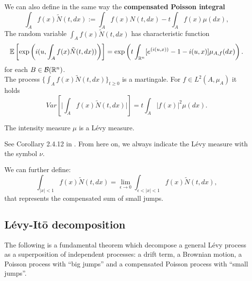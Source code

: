 \noindent
We can also define in the same way the \textbf{compensated Poisson integral}
\begin{equation}
  \int_A f(x) \tilde{N}(t,dx) := \int_A f(x) N(t,dx) - t \int_A f(x) \mu(dx), 
\end{equation}
The random variable $\int_A f(x) \tilde{N}(t,dx)$ has characteristic function
\begin{equation}
  \mathbb{E} \left[ \exp \left( i(u,\int_A f(x) \tilde{N}(t,dx)) \right) \right] = 
  \exp \left( t \int_{\mathbb{R}^n} [e^{(i(u,x))}-1-i(u,x)] \mu_{A,f}(dx) \right).
\end{equation}
for each $B \in \mathcal{B}(\mathbb{R}^n)$. \\
The process $\{\int_A f(x) \tilde N(t,dx)\}_{t \ge 0}$ is a martingale. For $f \in L^2(A,\mu_A)$ it holds
\begin{equation}
 Var \left[ \biggr|\int_A f(x) \tilde N(t,dx)\biggr|\right] = t \int_A |f(x)|^2 \mu(dx).
\end{equation}
\begin{Theorem}
 The intensity measure $\mu$ is a Lévy measure.
\end{Theorem}
 See Corollary 2.4.12 in \cite{Applebaum}. From here on, we always indicate the Lévy measure with the symbol $\nu$.
 
We can further define:
\begin{equation}
\int_{|x|<1} f(x) \tilde N(t,dx) = \lim_{\epsilon \to 0} \int_{\epsilon < |x| < 1} f(x) \tilde N(t,dx), 
\end{equation}
that represents the compensated sum of small jumps.

 
\subsection{Lévy-It\={o} decomposition}

The following is a fundamental theorem which decompose a general Lévy process as a superposition 
of independent processes: a drift term, a Brownian motion, a Poisson process with ``big jumps'' and a compensated Poisson process with ``small jumps''.


